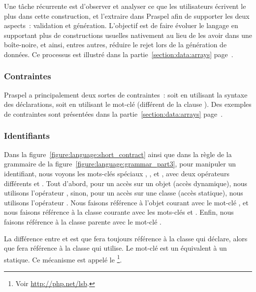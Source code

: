 Une tâche récurrente est d'observer et analyser ce que les utilisateurs écrivent
le plus dans cette construction, et l'extraire dans Praspel afin de supporter
les deux aspects~: validation et génération. L'objectif est de faire évoluer le
langage en supportant plus de constructions usuelles nativement au lieu de les
avoir dans une boîte-noire, et ainsi, entres autres, réduire le rejet lors de la
génération de données. Ce processus est illustré dans la
partie~\ref{section:data:arrays} page~\pageref{section:data:arrays}.

\subsubsection{Contraintes}

Praspel a principalement deux sortes de contraintes~: soit en utilisant la
syntaxe des déclarations, soit en utilisant le mot-clé  (différent de
la clause \ais). Des exemples de contraintes sont présentées dans la
partie~\ref{section:data:arrays} page~\pageref{section:data:arrays}.

\subsubsection{Identifiants}

Dans la figure~\ref{figure:language:short_contract} ainsi que dans la règle
 de la grammaire de la
figure~\ref{figure:language:grammar_part3}, pour manipuler un identifiant, nous
voyons les mots-clés spéciaux , ,  et
, avec deux opérateurs différents \code{->} et \code{::}. Tout
d'abord, pour un accès sur un objet (accès dynamique), nous utilisons
l'opérateur \code{->}, sinon, pour un accès sur une classe (accès statique),
nous utilisons l'opérateur \code{::}. Nous faisons référence à l'objet courant
avec le mot-clé , et nous faisons référence à la classe courante avec
les mots-clés  et . Enfin, nous faisons référence à la
classe parente avec le mot-clé .

La différence entre  et  est que  fera
toujours référence à la classe qui déclare, alors que  fera
référence à la classe qui utilise. Le mot-clé  est un équivalent à
un  statique. Ce mécanisme est appelé le \footnote{Voir \url{http://php.net/lsb}.}.

